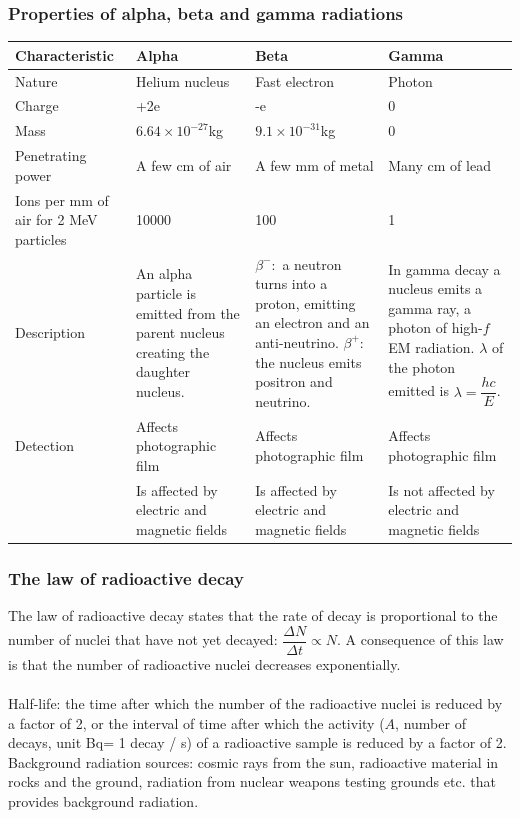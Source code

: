 \documentclass[a4paper,12pt]{article}
\begin{document}
\subsubsection*{Properties of alpha, beta and gamma radiations}
\begin{center}
\begin{tabularx}{\textwidth}{@{}|Y |Y |Y| Y|@{}}
\toprule
\textbf{Characteristic} & \textbf{Alpha} & \textbf{Beta} & \textbf{Gamma} \\
\midrule
Nature & Helium nucleus & Fast electron & Photon\\
\midrule
Charge & +2e & -e & 0\\
\midrule
Mass & $6.64\times 10^{-27}$kg & $9.1\times 10^{-31}$kg & 0\\
\midrule
Penetrating power & A few cm of air & A few mm of metal & Many cm of lead \\\midrule
Ions per mm of air for 2 MeV particles & 10000 & 100 & 1\\\midrule
Description & An alpha particle is emitted from the parent nucleus creating the daughter nucleus. 
& $\beta^-:$ a neutron turns into a proton, emitting an electron and an anti-neutrino. $\beta^+$: the nucleus emits positron and neutrino. 
& In gamma decay a nucleus emits a gamma ray, a photon of high-$f$ EM radiation. $\lambda$ of the photon emitted is $\lambda=\dfrac{hc}{E}$.\\\midrule
Detection & Affects photographic film & Affects photographic film & Affects photographic film\\
 & Is affected by electric and magnetic fields & Is affected by electric and magnetic fields &Is not affected by electric and magnetic fields\\
\bottomrule
\end{tabularx}
\end{center}
\subsubsection*{The law of radioactive decay}
The law of radioactive decay states that the rate of decay is proportional to the number of nuclei that have not yet decayed: $\dfrac{\Delta N}{\Delta t}\propto N$.
A consequence of this law is that the number of radioactive nuclei decreases exponentially.\\\\
Half-life: the time after which the number of the radioactive nuclei is reduced by a factor of 2, or the interval of time after which the activity ($A$, number of decays, unit Bq= 1 decay / s) of a radioactive sample is reduced by a factor of 2.\\
Background radiation sources: cosmic rays from the sun, radioactive material in rocks and the ground, radiation from nuclear weapons testing grounds etc. that provides background radiation.
\end{document}
